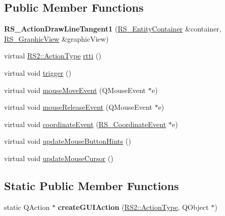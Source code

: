 \subsection*{Public Member Functions}
\begin{DoxyCompactItemize}
\item 
\hypertarget{classRS__ActionDrawLineTangent1_a72f5378d8a4dfc88d1460becfdaae674}{{\bfseries R\-S\-\_\-\-Action\-Draw\-Line\-Tangent1} (\hyperlink{classRS__EntityContainer}{R\-S\-\_\-\-Entity\-Container} \&container, \hyperlink{classRS__GraphicView}{R\-S\-\_\-\-Graphic\-View} \&graphic\-View)}\label{classRS__ActionDrawLineTangent1_a72f5378d8a4dfc88d1460becfdaae674}

\item 
virtual \hyperlink{classRS2_afe3523e0bc41fd637b892321cfc4b9d7}{R\-S2\-::\-Action\-Type} \hyperlink{classRS__ActionDrawLineTangent1_a2f948ba6acd585d67caea217e7bd503a}{rtti} ()
\item 
virtual void \hyperlink{classRS__ActionDrawLineTangent1_a6861bf90f170771fb37a57599fb9ee90}{trigger} ()
\item 
virtual void \hyperlink{classRS__ActionDrawLineTangent1_a803d2d58eac33b60d5643946d36ccce2}{mouse\-Move\-Event} (Q\-Mouse\-Event $\ast$e)
\item 
virtual void \hyperlink{classRS__ActionDrawLineTangent1_a4f6c03de9e43da6485d64347fe8e98c2}{mouse\-Release\-Event} (Q\-Mouse\-Event $\ast$e)
\item 
virtual void \hyperlink{classRS__ActionDrawLineTangent1_aeb4a29922ea29bbd8041271bccd114cd}{coordinate\-Event} (\hyperlink{classRS__CoordinateEvent}{R\-S\-\_\-\-Coordinate\-Event} $\ast$e)
\item 
virtual void \hyperlink{classRS__ActionDrawLineTangent1_a3add1df5f73234cfc4570bea23c549c5}{update\-Mouse\-Button\-Hints} ()
\item 
virtual void \hyperlink{classRS__ActionDrawLineTangent1_a65f3e61f26f28e4c1b389b080742bc58}{update\-Mouse\-Cursor} ()
\end{DoxyCompactItemize}
\subsection*{Static Public Member Functions}
\begin{DoxyCompactItemize}
\item 
\hypertarget{classRS__ActionDrawLineTangent1_a87181f5e7f00c8c27bd3d119ceef1ab1}{static Q\-Action $\ast$ {\bfseries create\-G\-U\-I\-Action} (\hyperlink{classRS2_afe3523e0bc41fd637b892321cfc4b9d7}{R\-S2\-::\-Action\-Type}, Q\-Object $\ast$)}\label{classRS__ActionDrawLineTangent1_a87181f5e7f00c8c27bd3d119ceef1ab1}

\end{DoxyCompactItemize}
